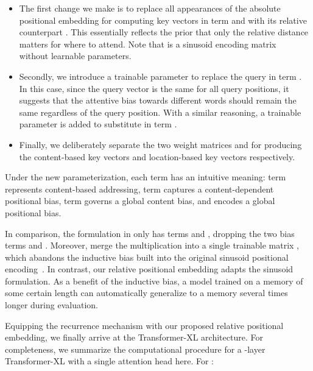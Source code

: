 \documentclass[11pt,a4paper]{article}
\begin{document}
\begin{itemize}[leftmargin=*,itemsep=0pt,parsep=0.5em,topsep=0pt,partopsep=0pt]
	\item The first change we make is to replace all appearances of the absolute positional embedding  for computing key vectors in term  and  with its relative counterpart .
	This essentially reflects the prior that only the relative distance matters for where to attend.
	Note that  is a sinusoid encoding matrix~\citep{vaswani2017attention} without learnable parameters.
	\item Secondly, we introduce a trainable parameter  to replace the query  in term .
	In this case, since the query vector is the same for all query positions, it suggests that the attentive bias towards different words should remain the same regardless of the query position.
	With a similar reasoning, a trainable parameter  is added to substitute  in term .
	\item Finally, we deliberately separate the two weight matrices  and  for producing the content-based key vectors and location-based key vectors respectively.
\end{itemize}
Under the new parameterization, each term has an intuitive meaning: term  represents content-based addressing, term  captures a content-dependent positional bias, term  governs a global content bias, and  encodes a global positional bias.

In comparison, the formulation in \citet{shaw2018self} only has terms  and , dropping the two bias terms  and .
Moreover, \citet{shaw2018self} merge the multiplication  into a single trainable matrix , which abandons the inductive bias built into the original sinusoid positional encoding~\citep{vaswani2017attention}.
In contrast, our relative positional embedding  adapts the sinusoid formulation.
As a benefit of the inductive bias, a model trained on a memory of some certain length can automatically generalize to a memory several times longer during evaluation.

Equipping the recurrence mechanism with our proposed relative positional embedding, we finally arrive at the Transformer-XL architecture.
For completeness, we summarize the computational procedure for a -layer Transformer-XL with a single attention head here. For :
\par\nobreak
\vspace{-0.5em}
\small
\begingroup
\allowdisplaybreaks

\endgroup
\normalsize
\vspace{-1.5em}
\end{document}
